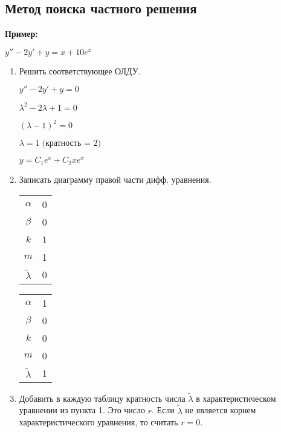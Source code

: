 \documentclass[10pt, a4paper]{article}
\begin{document}
\subsection{Метод поиска частного решения}
\textbf{Пример:}
\par $y'' - 2y' + y = x + 10e^x$
\begin{enumerate}
    \item Решить соответствующее ОЛДУ.
        \par $y'' - 2y' + y = 0$
        \par $\lambda^2 - 2\lambda + 1 = 0$
        \par $(\lambda - 1)^2 = 0$
        \par $\lambda = 1 \; \text{(кратность = 2)}$
        \par $y = C_1e^x + C_2xe^x$
    \item Записать диаграмму правой части дифф. уравнения.
        \par
            \begin{tabular}{ |c|c| }
                \hline
                $\alpha$              & 0 \\
                $\beta$               & 0 \\
                $k$                   & 1 \\
                $m$                   & 1 \\
                $\widetilde{\lambda}$ & 0 \\
                \hline
            \end{tabular}
            \begin{tabular}{ |c|c| }
                \hline
                $\alpha$              & 1 \\
                $\beta$               & 0 \\
                $k$                   & 0 \\
                $m$                   & 0 \\
                $\widetilde{\lambda}$ & 1 \\
                \hline
            \end{tabular}
    \item Добавить в каждую таблицу кратность числа $\widetilde{\lambda}$ в характеристическом уравнении из пункта 1. Это число $r$. Если $\widetilde{\lambda}$ не является корнем характеристического уравнения, то считать $r = 0$.
        \par
            \begin{tabular}{ |c|c| }

\end{tabular}
\end{enumerate}
\end{document}
